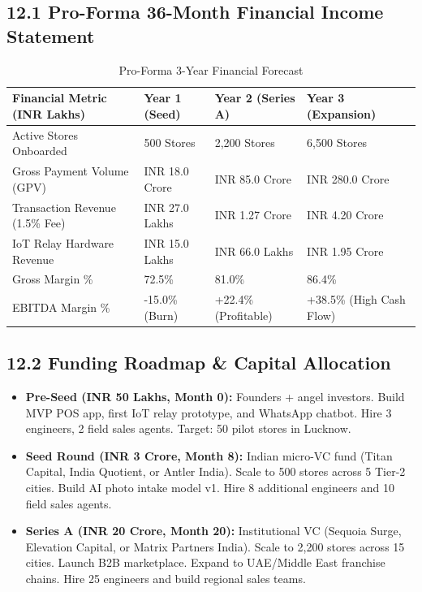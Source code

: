 \documentclass[11pt,a4paper]{article}
\begin{document}
\subsection{12.1 Pro-Forma 36-Month Financial Income Statement}

\begin{table}[h!]
\centering
\small
\begin{tabularx}{\textwidth}{XXXX}
\toprule
\textbf{Financial Metric (INR Lakhs)} & \textbf{Year 1 (Seed)} & \textbf{Year 2 (Series A)} & \textbf{Year 3 (Expansion)} \\
\midrule
Active Stores Onboarded & 500 Stores & 2,200 Stores & 6,500 Stores \\
Gross Payment Volume (GPV) & INR 18.0 Crore & INR 85.0 Crore & INR 280.0 Crore \\
Transaction Revenue (1.5\% Fee) & INR 27.0 Lakhs & INR 1.27 Crore & INR 4.20 Crore \\
IoT Relay Hardware Revenue & INR 15.0 Lakhs & INR 66.0 Lakhs & INR 1.95 Crore \\
Gross Margin \% & 72.5\% & 81.0\% & 86.4\% \\
EBITDA Margin \% & -15.0\% (Burn) & +22.4\% (Profitable) & +38.5\% (High Cash Flow) \\
\bottomrule
\end{tabularx}
\caption{Pro-Forma 3-Year Financial Forecast}
\end{table}

\subsection{12.2 Funding Roadmap \& Capital Allocation}

\begin{tcolorbox}[colback=bluebg,colframe=blueaccent,title=\textbf{3-Round Funding Strategy:}]
\begin{itemize}[leftmargin=*]
    \item \textbf{Pre-Seed (INR 50 Lakhs, Month 0):} Founders + angel investors. Build MVP POS app, first IoT relay prototype, and WhatsApp chatbot. Hire 3 engineers, 2 field sales agents. Target: 50 pilot stores in Lucknow.
    \item \textbf{Seed Round (INR 3 Crore, Month 8):} Indian micro-VC fund (Titan Capital, India Quotient, or Antler India). Scale to 500 stores across 5 Tier-2 cities. Build AI photo intake model v1. Hire 8 additional engineers and 10 field sales agents.
    \item \textbf{Series A (INR 20 Crore, Month 20):} Institutional VC (Sequoia Surge, Elevation Capital, or Matrix Partners India). Scale to 2,200 stores across 15 cities. Launch B2B marketplace. Expand to UAE/Middle East franchise chains. Hire 25 engineers and build regional sales teams.
\end{itemize}
\end{tcolorbox}
\end{document}
